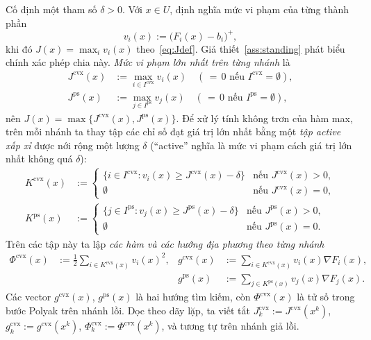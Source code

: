 \documentclass[]{interact}
\theoremstyle{plain}
\theoremstyle{definition}
\theoremstyle{remark}
\newcommand{\cvx}{\mathrm{cvx}}
\newcommand{\ps}{\mathrm{ps}}
\begin{document}
Cố định một tham số $\delta>0$. Với $x\in U$, định nghĩa mức vi phạm của từng thành phần
\begin{equation}\label{eq:vi}
v_i(x):=\bigl(F_i(x)-b_i\bigr)^+,
\end{equation}
khi đó $J(x)=\max_i v_i(x)$ theo~\eqref{eq:Jdef}. Giả thiết~\ref{ass:standing} phát biểu chính xác
phép chia này. \emph{Mức vi phạm lớn nhất trên từng nhánh} là
\begin{align}
J^{\cvx}(x)&:=\max_{i\in I^{\cvx}}v_i(x)\quad(\,{=}\,0\text{ nếu }I^{\cvx}=\emptyset),\label{eq:Jcvx}\\
J^{\ps}(x)&:=\max_{j\in I^{\ps}}v_j(x)\quad(\,{=}\,0\text{ nếu }I^{\ps}=\emptyset),\label{eq:Jps}
\end{align}
nên $J(x)=\max\{J^{\cvx}(x),J^{\ps}(x)\}$. Để xử lý tính không trơn của hàm max,
trên mỗi nhánh ta thay tập các chỉ số đạt giá trị lớn nhất bằng một \emph{tập active xấp xỉ}
được nới rộng một lượng $\delta$ (``active'' nghĩa là mức vi phạm cách giá trị lớn nhất
không quá $\delta$):
\begin{align}
K^{\cvx}(x)&:=\begin{cases}\{i\in I^{\cvx}:v_i(x)\ge J^{\cvx}(x)-\delta\} & \text{nếu }J^{\cvx}(x)>0,\\ \emptyset & \text{nếu }J^{\cvx}(x)=0,\end{cases}\label{eq:Kcvx}\\[2pt]
K^{\ps}(x)&:=\begin{cases}\{j\in I^{\ps}:v_j(x)\ge J^{\ps}(x)-\delta\} & \text{nếu }J^{\ps}(x)>0,\\ \emptyset & \text{nếu }J^{\ps}(x)=0.\end{cases}\label{eq:Kps}
\end{align}
Trên các tập này ta lập \emph{các hàm và các hướng địa phương theo từng nhánh}
\begin{align}
\Phi^{\cvx}(x)&:=\tfrac12\!\!\sum_{i\in K^{\cvx}(x)}\!\! v_i(x)^2, & g^{\cvx}(x)&:=\!\!\sum_{i\in K^{\cvx}(x)}\!\! v_i(x)\nabla F_i(x),\label{eq:phi-g-cvx}\\
& & g^{\ps}(x)&:=\!\!\sum_{j\in K^{\ps}(x)}\!\! v_j(x)\nabla F_j(x).\label{eq:phi-g-ps}
\end{align}
Các vector $g^{\cvx}(x)$, $g^{\ps}(x)$ là hai hướng tìm kiếm, còn $\Phi^{\cvx}(x)$
là tử số trong bước Polyak trên nhánh lồi. Dọc theo dãy lặp, ta viết tắt
$J^{\cvx}_k:=J^{\cvx}(x^k)$, $g^{\cvx}_k:=g^{\cvx}(x^k)$, $\Phi^{\cvx}_k:=\Phi^{\cvx}(x^k)$,
và tương tự trên nhánh giả lồi.
\end{document}
